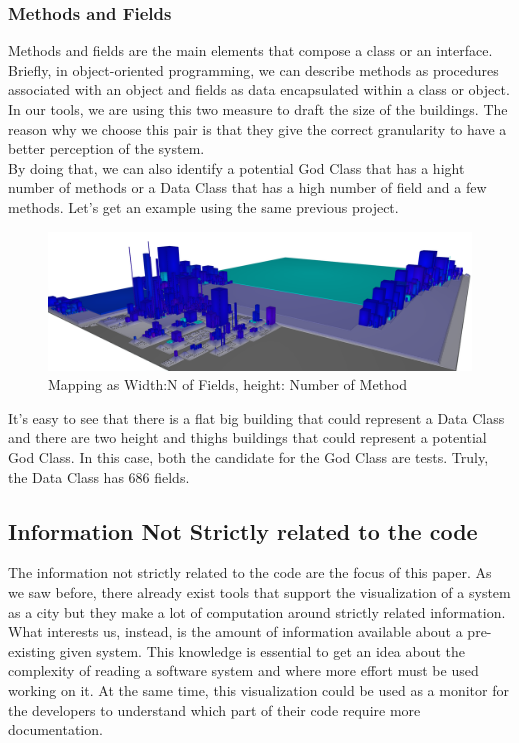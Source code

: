 \documentclass[]{usiinfbachelorproject}
\begin{document}
\subsubsection{Methods  and Fields}
Methods and fields are the main elements that compose a class or an interface. Briefly, in object-oriented programming, we can describe methods as procedures associated with an object and fields as data encapsulated within a class or object.\\
In our tools, we are using this two measure to draft the size of the buildings. The reason why we choose this pair is that they give the correct granularity to have a better perception of the system.\\
By doing that, we can also identify a potential God Class that has a hight number of methods or a Data Class that has a high number of field and a few methods. Let's get an example using the same previous project.
\begin{figure}[h]
	\centering
	\includegraphics[width=1\textwidth]{images/fieldAndMethod}
	\caption[Fields and Methods Mapping]{Mapping as Width:N of Fields, height: Number of Method \label{fig:fieldAndMethods}}




	

\end{figure}

It's easy to see that there is a flat big building that could represent a Data Class and there are two height and thighs buildings that could represent a potential God Class. In this case, both the candidate for the God Class are tests. Truly, the Data Class has 686 fields.


    
\newpage
\subsection{Information Not Strictly related to the code}
The information not strictly related to the code are the focus of this paper. As we saw before, there already exist tools that support the visualization of a system as a city but they make a lot of computation around strictly related information. What interests us, instead, is the amount of information available about a pre-existing given system. 
This knowledge is essential to get an idea about the complexity of reading a software system and where more effort must be used working on it. At the same time, this visualization could be used as a monitor for the developers to understand which part of their code require more documentation.
\end{document}
